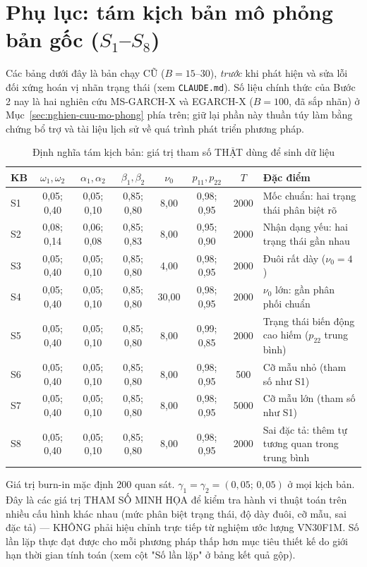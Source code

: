 \documentclass[11pt,a4paper]{article}
\begin{document}
\section{Phụ lục: tám kịch bản mô phỏng bản gốc (\texorpdfstring{$S_1$--$S_8$}{S1-S8})}

Các bảng dưới đây là bản chạy CŨ ($B=15$--$30$), \emph{trước} khi phát hiện và
sửa lỗi đối xứng hoán vị nhãn trạng thái (xem \texttt{CLAUDE.md}). Số liệu
chính thức của Bước 2 nay là hai nghiên cứu MS-GARCH-X và EGARCH-X ($B=100$, đã sắp nhãn) ở
Mục~\ref{sec:nghien-cuu-mo-phong} phía trên; giữ lại phần này thuần túy làm
bằng chứng bổ trợ và tài liệu lịch sử về quá trình phát triển phương pháp.

\begin{table}[H]\centering\footnotesize
\caption{Định nghĩa tám kịch bản: giá trị tham số THẬT dùng để sinh dữ liệu}
\begin{tabularx}{\textwidth}{l C C C C C C L}
\toprule
\textbf{KB} & $\omega_{1},\omega_{2}$ & $\alpha_{1},\alpha_{2}$ & $\beta_{1},\beta_{2}$ & $\nu_0$ & $p_{11},p_{22}$ & $T$ & \textbf{Đặc điểm} \\
\midrule
S1 & 0{,}05; 0{,}40 & 0{,}05; 0{,}10 & 0{,}85; 0{,}80 & 8{,}00 & 0{,}98; 0{,}95 & 2000 & Mốc chuẩn: hai trạng thái phân biệt rõ \\
S2 & 0{,}08; 0{,}14 & 0{,}06; 0{,}08 & 0{,}85; 0{,}83 & 8{,}00 & 0{,}95; 0{,}90 & 2000 & Nhận dạng yếu: hai trạng thái gần nhau \\
S3 & 0{,}05; 0{,}40 & 0{,}05; 0{,}10 & 0{,}85; 0{,}80 & 4{,}00 & 0{,}98; 0{,}95 & 2000 & Đuôi rất dày ($\nu_0=4$) \\
S4 & 0{,}05; 0{,}40 & 0{,}05; 0{,}10 & 0{,}85; 0{,}80 & 30{,}00 & 0{,}98; 0{,}95 & 2000 & $\nu_0$ lớn: gần phân phối chuẩn \\
S5 & 0{,}05; 0{,}40 & 0{,}05; 0{,}10 & 0{,}85; 0{,}80 & 8{,}00 & 0{,}99; 0{,}85 & 2000 & Trạng thái biến động cao hiếm ($p_{22}$ trung bình) \\
S6 & 0{,}05; 0{,}40 & 0{,}05; 0{,}10 & 0{,}85; 0{,}80 & 8{,}00 & 0{,}98; 0{,}95 & 500 & Cỡ mẫu nhỏ (tham số như S1) \\
S7 & 0{,}05; 0{,}40 & 0{,}05; 0{,}10 & 0{,}85; 0{,}80 & 8{,}00 & 0{,}98; 0{,}95 & 5000 & Cỡ mẫu lớn (tham số như S1) \\
S8 & 0{,}05; 0{,}40 & 0{,}05; 0{,}10 & 0{,}85; 0{,}80 & 8{,}00 & 0{,}98; 0{,}95 & 2000 & Sai đặc tả: thêm tự tương quan trong trung bình \\
\bottomrule
\end{tabularx}
\begin{tablenotes}\footnotesize
\item Giá trị burn-in mặc định 200 quan sát. $\gamma_1=\gamma_2=(0{,}05;\,0{,}05)$ ở mọi kịch bản. Đây là các giá trị THAM SỐ MINH HỌA để kiểm tra hành vi thuật toán trên nhiều cấu hình khác nhau (mức phân biệt trạng thái, độ dày đuôi, cỡ mẫu, sai đặc tả) --- KHÔNG phải hiệu chỉnh trực tiếp từ nghiệm ước lượng VN30F1M. Số lần lặp thực đạt được cho mỗi phương pháp thấp hơn mục tiêu thiết kế do giới hạn thời gian tính toán (xem cột "Số lần lặp" ở bảng kết quả gộp).
\end{tablenotes}
\end{table}
\end{document}
